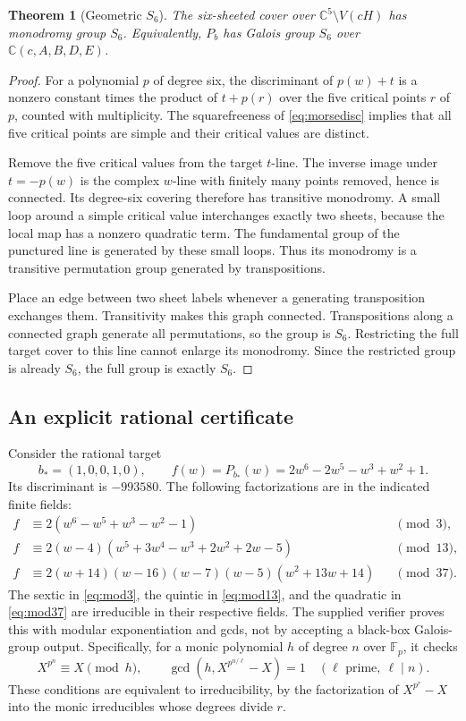 \documentclass[11pt,a4paper]{article}
\newtheorem{theorem}{Theorem}[section]
\theoremstyle{definition}
\newcommand{\C}{\mathbb C}
\begin{document}
\begin{theorem}[Geometric $S_6$]\label{thm:geometricS6}
The six-sheeted cover over $\C^5\setminus V(cH)$ has monodromy group
$S_6$. Equivalently, $P_b$ has Galois group $S_6$ over
$\C(c,A,B,D,E)$.
\end{theorem}
\begin{proof}
For a polynomial $p$ of degree six, the discriminant of $p(w)+t$ is a
nonzero constant times the product of $t+p(r)$ over the five critical
points $r$ of $p$, counted with multiplicity. The squarefreeness of
\eqref{eq:morsedisc} implies that all five critical points are simple
and their critical values are distinct.

Remove the five critical values from the target $t$-line. The inverse
image under $t=-p(w)$ is the complex $w$-line with finitely many points
removed, hence is connected. Its degree-six covering therefore has
transitive monodromy. A small loop around a simple critical value
interchanges exactly two sheets, because the local map has a nonzero
quadratic term. The fundamental group of the punctured line is generated
by these small loops. Thus its monodromy is a transitive permutation
group generated by transpositions.

Place an edge between two sheet labels whenever a generating
transposition exchanges them. Transitivity makes this graph connected.
Transpositions along a connected graph generate all permutations, so
the group is $S_6$. Restricting the full target cover to this line cannot
enlarge its monodromy. Since the restricted group is already $S_6$, the
full group is exactly $S_6$.
\end{proof}

\subsection{An explicit rational certificate}
Consider the rational target
\[
 b_*=(1,0,0,1,0),\qquad
 f(w)=P_{b_*}(w)=2w^6-2w^5-w^3+w^2+1.
\]
Its discriminant is $-993580$. The following factorizations are in the
indicated finite fields:
\begin{align}
 f&\equiv2(w^6-w^5+w^3-w^2-1)&&\pmod3,\label{eq:mod3}\\
 f&\equiv2(w-4)(w^5+3w^4-w^3+2w^2+2w-5)&&\pmod{13},\label{eq:mod13}\\
 f&\equiv2(w+14)(w-16)(w-7)(w-5)(w^2+13w+14)&&\pmod{37}.
 \label{eq:mod37}
\end{align}
The sextic in \eqref{eq:mod3}, the quintic in \eqref{eq:mod13}, and the
quadratic in \eqref{eq:mod37} are irreducible in their respective fields.
The supplied verifier proves this with modular exponentiation and gcds,
not by accepting a black-box Galois-group output. Specifically, for a
monic polynomial $h$ of degree $n$ over $\mathbb F_p$, it checks
\[
 X^{p^n}\equiv X\pmod h,
 \qquad
 \gcd(h,X^{p^{n/\ell}}-X)=1
 \quad(\ell\text{ prime},\ \ell\mid n).
\]
These conditions are equivalent to irreducibility, by the factorization
of $X^{p^r}-X$ into the monic irreducibles whose degrees divide $r$.
\end{document}
